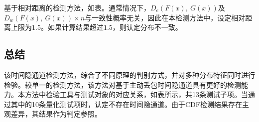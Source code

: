 
基于相对距离的检测方法，如表。通常情况下，$D_{e}(F(x),\ G(x))$及$D_{w}(F(x),\ G(x))\times n$与一致性概率无关，因此在本检测方法中，设定相对距离上限为$1.5$。如果计算结果超过$1.5$，则认定分布不一致。

\subsection{总结}
\label{chap:analyze:statistical:sum}
该时间隐通道检测方法，综合了不同原理的判别方式，并对多种分布特征同时进行检验。较单一的检测方法，该方法对基于主动丢包时间隐通道具有更好的检测能力。本方法中检验工具与测试对象的对应关系，如表所示，共13条测试子项。当通过其中的10条量化测试项时，认定不存在时间隐通道。由于CDF检测结果存在主观差异，其结果作为判定参照。

